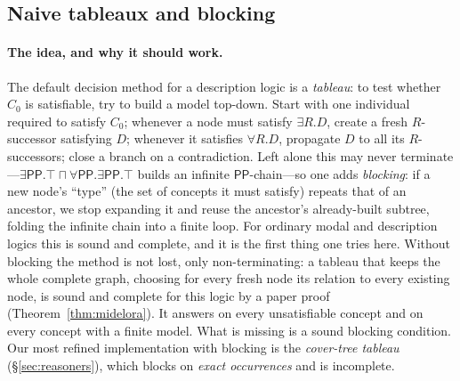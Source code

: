 \documentclass[11pt]{article}
\newcommand{\PP}{\mathsf{PP}}
\theoremstyle{plain}
\theoremstyle{definition}
\begin{document}
\subsection{Naive tableaux and blocking}
\label{ssec:approach-tableaux}

\paragraph{The idea, and why it should work.} The default decision method
for a description logic is a \emph{tableau}: to test whether $C_0$ is
satisfiable, try to build a model top-down. Start with one individual
required to satisfy $C_0$; whenever a node must satisfy $\exists R.D$,
create a fresh $R$-successor satisfying $D$; whenever it satisfies
$\forall R.D$, propagate $D$ to all its $R$-successors; close a branch on
a contradiction. Left alone this may never terminate---$\exists\PP.\top
\sqcap\forall\PP.\exists\PP.\top$ builds an infinite $\PP$-chain---so one
adds \emph{blocking}: if a new node's ``type'' (the set of concepts it
must satisfy) repeats that of an ancestor, we stop expanding it and reuse
the ancestor's already-built subtree, folding the infinite chain into a
finite loop. For ordinary modal and description logics this is sound and
complete, and it is the first thing one tries here. Without blocking the
method is not lost, only non-terminating: a tableau that keeps the whole
complete graph, choosing for every fresh node its relation to every existing
node, is sound and complete for this logic by a paper proof
(Theorem~\ref{thm:midelora}). It answers on every unsatisfiable concept and on
every concept with a finite model. What is missing is a sound blocking
condition. Our most refined implementation with blocking is the
\emph{cover-tree tableau} (\S\ref{sec:reasoners}), which blocks on \emph{exact
occurrences} and is incomplete.
\end{document}
